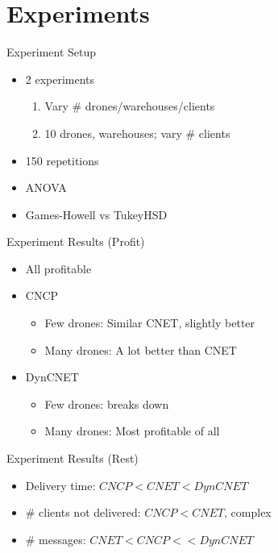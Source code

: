 \documentclass[notes]{beamer}
\begin{document}
	\section{Experiments}
	\begin{frame}{Experiment Setup}
		\begin{itemize}
			\item 2 experiments
				\begin{enumerate}
				\item Vary \# drones/warehouses/clients
				\item 10 drones, warehouses; vary \# clients
				\end{enumerate}
			\item 150 repetitions
			\item ANOVA
			\item Games-Howell vs TukeyHSD
		\end{itemize}
	\end{frame}
	\begin{frame}{Experiment Results (Profit)}
		\begin{itemize}
			\item All profitable
			\item CNCP
				\begin{itemize}
				\item Few drones: Similar CNET, slightly better
				\item Many drones: A lot better than CNET
				\end{itemize}
			\item DynCNET
			\begin{itemize}
				\item Few drones: breaks down
				\item Many drones: Most profitable of all
			\end{itemize}
		\end{itemize}
	\end{frame}
	\begin{frame}{Experiment Results (Rest)}
		\begin{itemize}
			\item Delivery time: $CNCP < CNET < DynCNET$
			\item \# clients not delivered: $CNCP < CNET$, complex
			\item \# messages: $CNET < CNCP << DynCNET$
		\end{itemize}
	\end{frame}
	
\end{document}

